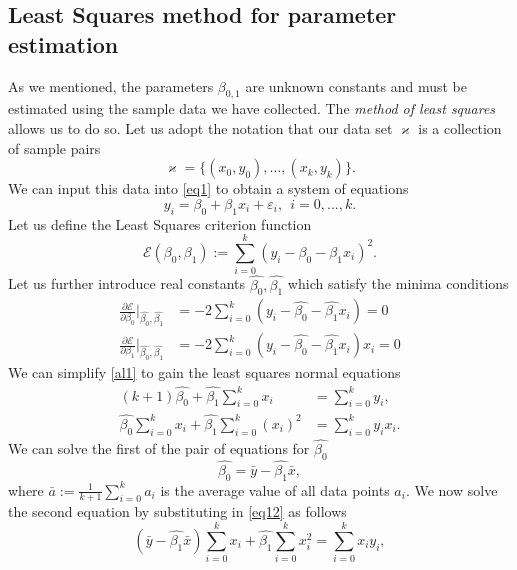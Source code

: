 \documentclass[10pt,a4paper, twocolumn, conference]{IEEEtran}
\begin{document}
\subsection{Least Squares method for parameter estimation}
As we mentioned, the parameters $\beta_{0,1}$ are unknown constants and must be estimated using the sample data we have collected. The \textit{method of least squares} allows us to do so. Let us adopt the notation that our data set $\varkappa$ is a collection of sample pairs
\begin{equation}
\varkappa = \{ (x_0, y_0), \ldots, (x_k, y_k) \}.
\end{equation}
We can input this data into \cref{eq1} to obtain a system of equations
\begin{equation}
y_i = \beta_0 + \beta_1 x_i + \varepsilon_i,~~i = 0, \ldots, k.
\end{equation}
Let us define the Least Squares criterion function
\begin{equation}
\mathcal{E}(\beta_0, \beta_1) := \sum_{i=0}^k (y_i - \beta_0 - \beta_1 x_i)^2.
\end{equation}
Let us further introduce real constants $\hat{\beta_0}, \hat{\beta_1}$ which satisfy the minima conditions
\begin{align} \label{al1} \nonumber
\frac{\partial \mathcal{E}}{\partial \beta_0} \Big|_{\hat{\beta_0}, \hat{\beta_1}} & = -2 \sum_{i=0}^k (y_i - \hat{\beta_0} - \hat{\beta_1}x_i) = 0 \\
\frac{\partial \mathcal{E}}{\partial \beta_1} \Big|_{\hat{\beta_0}, \hat{\beta_1}} & = -2 \sum_{i=0}^k (y_i - \hat{\beta_0} - \hat{\beta_1}x_i)x_i = 0
\end{align}
We can simplify \cref{al1} to gain the least squares normal equations
\begin{align}
\nonumber
(k + 1) \hat{\beta_0} + \hat{\beta_1} \sum_{i=0}^k x_i & = \sum_{i=0}^k y_i, \\
 \hat{\beta_0} \sum_{i=0}^k x_i + \hat{\beta_1} \sum_{i=0}^k (x_i)^2 & = \sum_{i=0}^k y_i x_i.
\end{align}
We can solve the first of the pair of equations for $\hat{\beta_0}$
\begin{equation} \label{eq12}
\hat{\beta_0} =\bar{y} - \hat{\beta_1} \bar{x},
\end{equation}
where $\bar{a} := \frac{1}{k+1} \sum_{i = 0}^k a_i$ is the average value of all data points $a_i$. We now solve the second equation by substituting in \cref{eq12} as follows
\begin{equation} \label{eq13}
(\bar{y} - \hat{\beta_1} \bar{x}) \sum_{i=0}^k x_i + \hat{\beta_1} \sum_{i=0}^k x_i^2 = \sum_{i=0}^k x_i y_i,
\end{equation}
\end{document}
